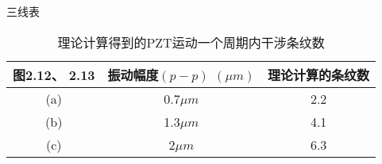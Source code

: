 三线表
\begin{table}[htbp]
\centering
 \caption{理论计算得到的PZT运动一个周期内干涉条纹数}
 \label{tab:theory}
 \begin{tabular}{ccc}
  \toprule
  图2.12、 2.13 & 振动幅度$(p-p)$ $(\mu m)$ & 理论计算的条纹数 \\
  \midrule
 (a) & 0.7$\mu m$ & 2.2 \\
 (b) & 1.3$\mu m$ & 4.1 \\
 (c) & 2$\mu m$ & 6.3 \\
  \bottomrule
 \end{tabular}
\end{table}

